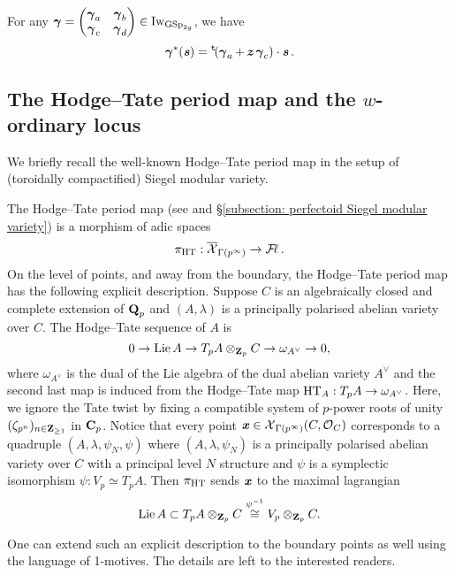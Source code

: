 \begin{Corollary}\label{Corollary: Iw-action on s}
For any $\operatorname{\boldsymbol{\gamma}} = \begin{pmatrix}\operatorname{\boldsymbol{\gamma}}_a & \operatorname{\boldsymbol{\gamma}}_b\\ \operatorname{\boldsymbol{\gamma}}_c & \operatorname{\boldsymbol{\gamma}}_d\end{pmatrix}\in \operatorname{Iw}_{\operatorname{GSp}_{2g}}$, we have \[
    \operatorname{\boldsymbol{\gamma}}^*(\operatorname{\textbf{\textit{s}}}) =  \operatorname{^{\mathtt{t}}\!}(\operatorname{\boldsymbol{\gamma}}_a + \operatorname{\textbf{\textit{z}}} \operatorname{\boldsymbol{\gamma}}_c) \cdot \operatorname{\textbf{\textit{s}}}.
\] 
\end{Corollary}


\subsection{The Hodge--Tate period map and the \texorpdfstring{$w$}{w}-ordinary locus}\label{subsection: Hodge--Tate period map and the w-ordinary locus}

We briefly recall the well-known Hodge--Tate period map in the setup of (toroidally compactified) Siegel modular variety.

The Hodge--Tate period map (see \cite[\S 1]{Pilloni-Stroh-CoherentCohomologyandGaloisRepresentations} and \S \ref{subsection: perfectoid Siegel modular variety}) is a morphism of adic spaces
$$\pi_{\operatorname{HT}}:\overline{\operatorname{\mathcal{X}}}_{\Gamma(p^{\infty})}\rightarrow \operatorname{\mathcal{F}\!\mathbf{\ell}}.$$
On the level of points, and away from the boundary, the Hodge--Tate period map has the following explicit description. Suppose 
$C$ is an algebraically closed and complete extension of $\operatorname{\mathbf{Q}}_p$ and $(A, \lambda)$ is a principally polarised abelian variety over $C$. The Hodge--Tate sequence of $A$ is
\[0\rightarrow \operatorname{Lie} A\rightarrow T_pA\otimes_{\operatorname{\mathbf{Z}}_p}C\rightarrow \omega_{A^{\vee}}\rightarrow 0,\] where ${\omega}_{A^{\vee}}$ is the dual of the Lie algebra of the dual abelian variety $A^{\vee}$ and the second last map is induced from the Hodge--Tate map $\operatorname{HT}_A:T_pA\rightarrow \omega_{A^{\vee}}$. 
Here, we ignore the Tate twist by fixing a compatible system of $p$-power roots of unity $(\zeta_{p^n})_{n\in \operatorname{\mathbf{Z}}_{\geq 1}}$ in $\operatorname{\mathbf{C}}_p$. Notice that every point $\operatorname{\textbf{\textit{x}}}\in \operatorname{\mathcal{X}}_{\Gamma(p^{\infty})}(C, \operatorname{\mathcal{O}}_C)$ corresponds to a quadruple $(A, \lambda, \psi_N, \psi)$ where $(A, \lambda, \psi_N)$ is a principally polarised abelian variety over $C$ with a principal level $N$ structure and $\psi$ is a symplectic isomorphism $\psi: V_p\simeq T_p A$. Then $\pi_{\operatorname{HT}}$ sends $\operatorname{\textbf{\textit{x}}}$ to the maximal lagrangian $$\operatorname{Lie} A\subset T_pA\otimes_{\operatorname{\mathbf{Z}}_p}C\overset{\psi^{-1}}{\cong} V_p\otimes_{\operatorname{\mathbf{Z}}_p} C.$$

One can extend such an explicit description to the boundary points as well using the language of 1-motives. The details are left to the interested readers.

